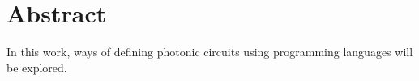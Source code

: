 \chapter*{Abstract}

In this work, ways of defining photonic circuits using programming languages will be explored. 